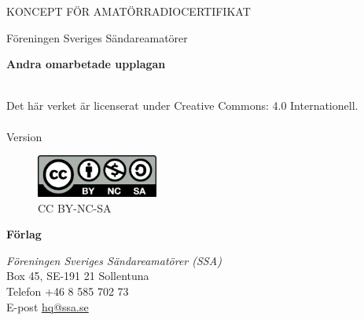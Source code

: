 \vspace{10em}

\begin{center}
\Large{KONCEPT FÖR AMATÖRRADIOCERTIFIKAT}

Föreningen Sveriges Sändareamatörer\\[2\baselineskip]
\end{center}


\noindent \textbf{Andra omarbetade upplagan}

\noindent
\\
\noindent Det här verket är licenserat under Creative Commons:\newline
\noindent{} 4.0 Internationell.
\\
\\
\noindent Version \revision

\begin{figure}
    \includegraphics[width=4cm]{images/cc-by-nc-sa}
    \caption*{CC BY-NC-SA}
\end{figure}


\vfill

\noindent
\textbf{Förlag}

\noindent
\textit{Föreningen Sveriges Sändareamatörer (SSA)}\\
Box 45, SE-191 21 Sollentuna\\
Telefon +46 8 585 702 73\\
E-post \href{mailto:hq@ssa.se}{hq@ssa.se}\\[\baselineskip]